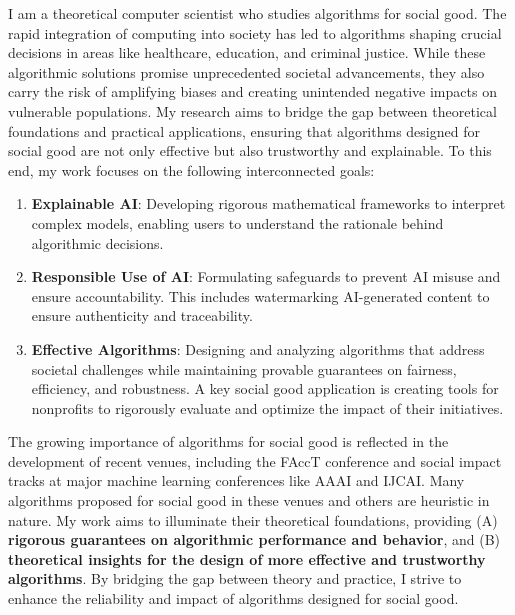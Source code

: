 \documentclass[11pt]{article}
\begin{document}
{\setlength{\parindent}{0cm}

I am a theoretical computer scientist who studies algorithms for social good.
The rapid integration of computing into society has led to algorithms shaping crucial decisions in areas like healthcare, education, and criminal justice. While these algorithmic solutions promise unprecedented societal advancements, they also carry the risk of amplifying biases and creating unintended negative impacts on vulnerable populations. My research aims to bridge the gap between theoretical foundations and practical applications, ensuring that algorithms designed for social good are not only effective but also trustworthy and explainable. 
To this end, my work focuses on the following interconnected goals:
\begin{enumerate}
    \item \textbf{Explainable AI}: Developing rigorous mathematical frameworks to interpret complex models, enabling users to understand the rationale behind algorithmic decisions.
    \item \textbf{Responsible Use of AI}: Formulating safeguards to prevent AI misuse and ensure accountability. This includes watermarking AI-generated content to ensure authenticity and traceability.
    \item \textbf{Effective Algorithms}: Designing and analyzing algorithms that address societal challenges while maintaining provable guarantees on fairness, efficiency, and robustness. A key social good application is creating tools for nonprofits to rigorously evaluate and optimize the impact of their initiatives.
\end{enumerate}

The growing importance of algorithms for social good is reflected in the development of recent venues, including the FAccT conference and social impact tracks at major machine learning conferences like AAAI and IJCAI.
Many algorithms proposed for social good in these venues and others are heuristic in nature. My work aims to illuminate their theoretical foundations, providing (A) \textbf{rigorous guarantees on algorithmic performance and behavior}, and (B) \textbf{theoretical insights for the design of more effective and trustworthy algorithms}.
By bridging the gap between theory and practice, I strive to enhance the reliability and impact of algorithms designed for social good.

}
\end{document}
